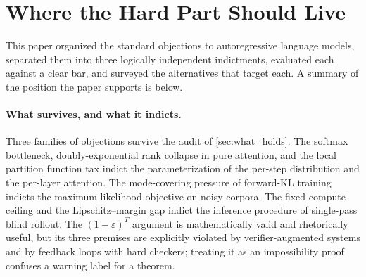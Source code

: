 
\section{Where the Hard Part Should Live}
\label{sec:conclusion}

This paper organized the standard objections to autoregressive language models, separated them into three logically independent indictments, evaluated each against a clear bar, and surveyed the alternatives that target each.
A summary of the position the paper supports is below.

\paragraph{What survives, and what it indicts.}
Three families of objections survive the audit of \cref{sec:what_holds}.
The softmax bottleneck, doubly-exponential rank collapse in pure attention, and the local partition function tax indict the parameterization of the per-step distribution and the per-layer attention.
The mode-covering pressure of forward-KL training indicts the maximum-likelihood objective on noisy corpora.
The fixed-compute ceiling and the Lipschitz--margin gap indict the inference procedure of single-pass blind rollout.
The $(1-\varepsilon)^T$ argument is mathematically valid and rhetorically useful, but its three premises are explicitly violated by verifier-augmented systems and by feedback loops with hard checkers;
treating it as an impossibility proof confuses a warning label for a theorem.

